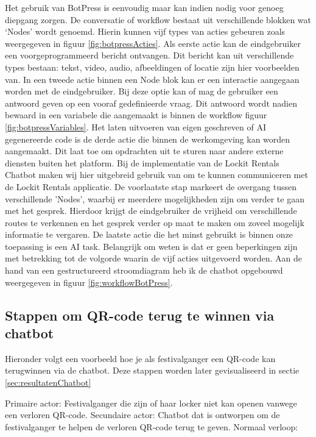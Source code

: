 Het gebruik van BotPress is eenvoudig maar kan indien nodig voor genoeg diepgang zorgen. De conversatie of workflow bestaat uit verschillende blokken wat ‘Nodes’ wordt genoemd. Hierin kunnen vijf types van acties gebeuren zoals weergegeven in figuur \ref{fig:botpressActies}. Als eerste actie kan de eindgebruiker een voorgeprogrammeerd bericht ontvangen. Dit bericht kan uit verschillende types bestaan: tekst, video, audio, afbeeldingen of locatie zijn hier voorbeelden van. In een tweede actie binnen een Node blok kan er een interactie aangegaan worden met de eindgebruiker. Bij deze optie kan of mag de gebruiker een antwoord geven op een vooraf gedefinieerde vraag. Dit antwoord wordt nadien bewaard in een variabele die aangemaakt is binnen de workflow figuur \ref{fig:botpressVariables}. Het laten uitvoeren van eigen geschreven of \ac{AI} gegenereerde code is de derde actie die binnen de werkomgeving kan worden aangemaakt. Dit laat toe om opdrachten uit te sturen naar andere externe diensten buiten het platform. Bij de implementatie van de Lockit Rentals Chatbot maken wij hier uitgebreid gebruik van om te kunnen communiceren met de Lockit Rentals applicatie. De voorlaatste stap markeert de overgang tussen verschillende 'Nodes', waarbij er meerdere mogelijkheden zijn om verder te gaan met het gesprek. Hierdoor krijgt de eindgebruiker de vrijheid om verschillende routes te verkennen en het gesprek verder op maat te maken om zoveel mogelijk informatie te vergaren. De laatste actie die het minst gebruikt is binnen onze toepassing is een \ac{AI} task. 
Belangrijk om weten is dat er geen beperkingen zijn met betrekking tot de volgorde waarin de vijf acties uitgevoerd worden. Aan de hand van een gestructureerd stroomdiagram heb ik de chatbot opgebouwd weergegeven in figuur \ref{fig:workflowBotPress}. 

\subsection{Stappen om QR-code terug te winnen via chatbot}

Hieronder volgt een voorbeeld hoe je als festivalganger een QR-code kan terugwinnen via de chatbot. Deze stappen worden later gevisualiseerd in sectie \ref{sec:resultatenChatbot}
\newline

Primaire actor: Festivalganger die zijn of haar locker niet kan openen vanwege een verloren QR-code.
\newline
Secundaire actor: Chatbot dat is ontworpen om de festivalganger te helpen de verloren QR-code terug te geven.
\newline
Normaal verloop:

